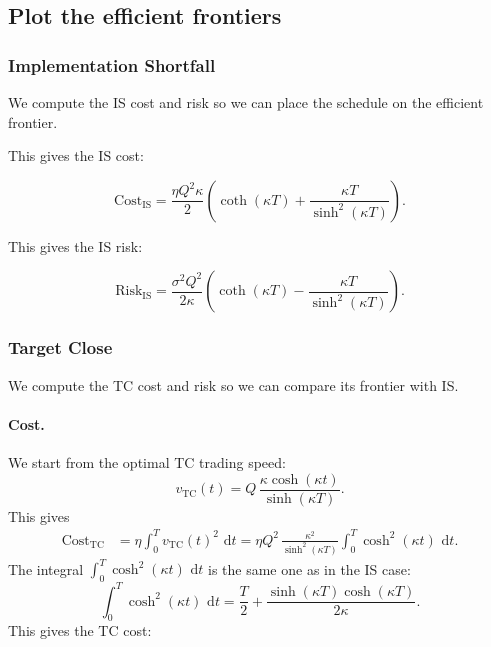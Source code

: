 \documentclass[12pt, a4paper]{article}
\newcommand{\dd}{\,\mathrm{d}}
\newcommand{\kap}{\kappa}
\begin{document}
\subsection{Plot the efficient frontiers}

\subsubsection{Implementation Shortfall}

We compute the IS cost and risk so we can place the schedule on the efficient frontier.

This gives the IS cost:

\begin{resultbox}
\[
  \mathrm{Cost}_{\mathrm{IS}}
  = \frac{\eta Q^2 \kap}{2}
    \left(\coth(\kap T) + \frac{\kap T}{\sinh^2(\kap T)}\right).
\]
\end{resultbox}

This gives the IS risk:

\begin{resultbox}
\[
  \mathrm{Risk}_{\mathrm{IS}}
  = \frac{\sigma^2 Q^2}{2\kap}
    \left(\coth(\kap T) - \frac{\kap T}{\sinh^2(\kap T)}\right).
\]
\end{resultbox}

\subsubsection{Target Close}

We compute the TC cost and risk so we can compare its frontier with IS.

\paragraph{Cost.}
We start from the optimal TC trading speed:
\[
  v_{\mathrm{TC}}(t) = Q\,\frac{\kap\cosh(\kap t)}{\sinh(\kap T)}.
\]
This gives
\begin{align*}
  \mathrm{Cost}_{\mathrm{TC}}
  &= \eta\int_0^T v_{\mathrm{TC}}(t)^2\,\dd t
   = \eta Q^2\,\frac{\kap^2}{\sinh^2(\kap T)}\int_0^T \cosh^2(\kap t)\,\dd t.
\end{align*}
The integral $\int_0^T \cosh^2(\kap t)\,\dd t$ is the same one as in the IS case:
\[
  \int_0^T \cosh^2(\kap t)\,\dd t
  = \frac{T}{2} + \frac{\sinh(\kap T)\cosh(\kap T)}{2\kap}.
\]
This gives the TC cost:
\end{document}
